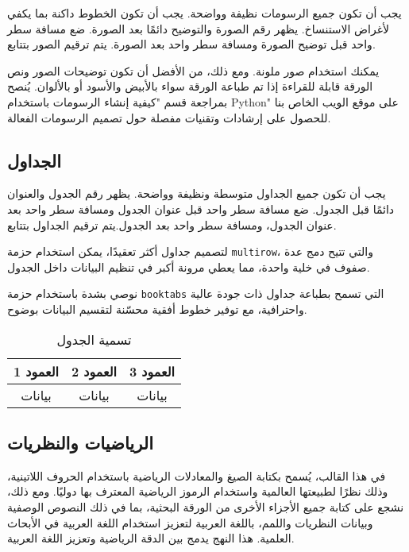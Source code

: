 \documentclass[12pt]{article}
\begin{document}
يجب أن تكون جميع الرسومات نظيفة وواضحة. يجب أن تكون الخطوط داكنة بما يكفي لأغراض الاستنساخ. يظهر رقم الصورة والتوضيح دائمًا بعد الصورة. ضع مسافة سطر واحد قبل توضيح الصورة ومسافة سطر واحد بعد الصورة. يتم ترقيم الصور بتتابع.

يمكنك استخدام صور ملونة. ومع ذلك، من الأفضل أن تكون توضيحات الصور ونص الورقة قابلة للقراءة إذا تم طباعة الورقة سواء بالأبيض والأسود أو بالألوان. يُنصح بمراجعة قسم "كيفية إنشاء الرسومات باستخدام Python" على موقع الويب الخاص بنا للحصول على إرشادات وتقنيات مفصلة حول تصميم الرسومات الفعالة.


\subsection{الجداول}

يجب أن تكون جميع الجداول متوسطة ونظيفة وواضحة. يظهر رقم الجدول والعنوان دائمًا قبل الجدول. ضع مسافة سطر واحد قبل عنوان الجدول ومسافة سطر واحد بعد عنوان الجدول، ومسافة سطر واحد بعد الجدول.يتم ترقيم الجداول بتتابع.

لتصميم جداول أكثر تعقيدًا، يمكن استخدام حزمة \verb|multirow|، والتي تتيح دمج عدة صفوف في خلية واحدة، مما يعطي مرونة أكبر في تنظيم البيانات داخل الجدول.

 نوصي بشدة باستخدام حزمة \verb|booktabs| التي تسمح بطباعة جداول ذات جودة عالية واحترافية، مع توفير خطوط أفقية محسّنة لتقسيم البيانات بوضوح.

\begin{table}[ht]
\centering
\caption{\textarabic{تسمية الجدول}}\label{tab:table}
\begin{tabular}{|c|c|c|}
\hline
\textarabic{العمود 1} & \textarabic{العمود 2} & \textarabic{العمود 3} \\
\hline
\textarabic{بيانات} & \textarabic{بيانات} & \textarabic{بيانات} \\
\hline
\end{tabular}
\end{table}

\subsection{الرياضيات والنظريات}
في هذا القالب، يُسمح بكتابة الصيغ والمعادلات الرياضية باستخدام الحروف اللاتينية، وذلك نظرًا لطبيعتها العالمية واستخدام الرموز الرياضية المعترف بها دوليًا. ومع ذلك، نشجع على كتابة جميع الأجزاء الأخرى من الورقة البحثية، بما في ذلك النصوص الوصفية وبيانات النظريات واللمم، باللغة العربية لتعزيز استخدام اللغة العربية في الأبحاث العلمية. هذا النهج يدمج بين الدقة الرياضية وتعزيز اللغة العربية.
\end{document}
